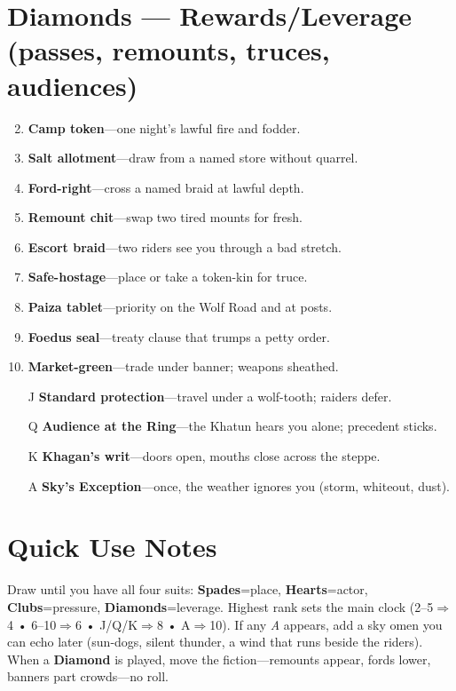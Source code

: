 \section*{\textbf{Diamonds} --- Rewards/Leverage (passes, remounts, truces, audiences)}
\begin{enumerate}
\setcounter{enumi}{1}
\item \textbf{Camp token}---one night's lawful fire and fodder.
\item \textbf{Salt allotment}---draw from a named store without quarrel.
\item \textbf{Ford-right}---cross a named braid at lawful depth.
\item \textbf{Remount chit}---swap two tired mounts for fresh.
\item \textbf{Escort braid}---two riders see you through a bad stretch.
\item \textbf{Safe-hostage}---place or take a token-kin for truce.
\item \textbf{Paiza tablet}---priority on the Wolf Road and at posts.
\item \textbf{Foedus seal}---treaty clause that trumps a petty order.
\item \textbf{Market-green}---trade under banner; weapons sheathed.
\item[J] \textbf{Standard protection}---travel under a wolf-tooth; raiders defer.
\item[Q] \textbf{Audience at the Ring}---the Khatun hears you alone; precedent sticks.
\item[K] \textbf{Khagan's writ}---doors open, mouths close across the steppe.
\item[A] \textbf{Sky's Exception}---once, the weather ignores you (storm, whiteout, dust).
\end{enumerate}

\section*{Quick Use Notes}
Draw until you have all four suits: \textbf{Spades}=place, \textbf{Hearts}=actor, \textbf{Clubs}=pressure, \textbf{Diamonds}=leverage. Highest rank sets the main clock (2--5$\Rightarrow$4 • 6--10$\Rightarrow$6 • J/Q/K$\Rightarrow$8 • A$\Rightarrow$10). If any \emph{A} appears, add a sky omen you can echo later (sun-dogs, silent thunder, a wind that runs beside the riders). When a \textbf{Diamond} is played, move the fiction---remounts appear, fords lower, banners part crowds---no roll.

